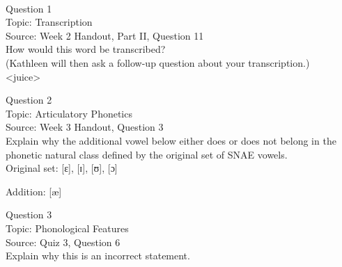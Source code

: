 \documentclass[12pt]{article}
\begin{document}
\newpage

\begin{center}
\textbf{{\color{red}{\HUGE END OF EXAM}}}\\

\end{center}
\newpage

\begin{center}
\textbf{{\color{blue}{\HUGE START OF EXAM\\}}}

\textbf{{\color{blue}{\HUGE Student ID: 65295\\}}}

\textbf{{\color{blue}{\HUGE \\}}}

\end{center}
\newpage

{\large Question 1}\\

Topic: Transcription\\
Source: Week 2 Handout, Part II, Question 11\\

How would this word be transcribed?\\ (Kathleen will then ask a follow-up question about your transcription.)\\

<juice>


\newpage

{\large Question 2}\\

Topic: Articulatory Phonetics\\
Source: Week 3 Handout, Question 3\\

Explain why the additional vowel below either does or does not belong in the phonetic natural class defined by the original set of SNAE vowels.\\

Original set: {[ɛ]}, {[ɪ]}, {[ʊ]}, {[ɔ]}

Addition: {[æ]}


\newpage

{\large Question 3}\\

Topic: Phonological Features\\
Source: Quiz 3, Question 6\\

Explain why this is an incorrect statement.\\
\end{document}

